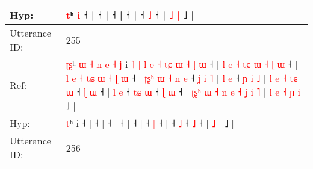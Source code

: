\documentclass[10pt]{article}
\DeclareRobustCommand{\hl}[1]{{\textcolor{red}{#1}}}
\begin{document}
\begin{longtable}{ll}
 \\
Hyp: & \hl{}\hl{}\hl{}\hl{}\hl{}\hl{}\hl{}\hl{}\hl{}\hl{}\hl{}\hl{}\hl{}\hl{}\hl{}\hl{t}ʰ \hl{i} ˧ |\hl{}\hl{}\hl{}\hl{}\hl{}\hl{}\hl{}\hl{}\hl{}\hl{}\hl{}\hl{} ˧\hl{}\hl{}\hl{}\hl{}\hl{}\hl{} |\hl{}\hl{}\hl{}\hl{} ˧\hl{}\hl{}\hl{}\hl{}\hl{}\hl{}\hl{}\hl{}\hl{}\hl{}\hl{}\hl{}\hl{}\hl{}\hl{}\hl{} |\hl{}\hl{}\hl{}\hl{} ˧ |\hl{}\hl{}\hl{}\hl{}\hl{}\hl{} ˧\hl{}\hl{} \hl{˩} ˧\hl{}\hl{}\hl{}\hl{}\hl{}\hl{} |\hl{}\hl{}\hl{}\hl{}\hl{}\hl{}\hl{}\hl{}\hl{}\hl{}\hl{}\hl{}\hl{}\hl{}\hl{}\hl{}\hl{} \hl{˩} \hl{}\hl{|} ˩ |
 \\
\midrule
Utterance ID: & 255 \\
Ref: & \hl{ʈ}\hl{ʂ}ʰ\hl{ }\hl{ɯ}\hl{ }\hl{˧}\hl{ }\hl{n}\hl{ }\hl{e}\hl{ }\hl{˧}\hl{ }\hl{ʝ} i\hl{ }\hl{˥}\hl{ }\hl{|}\hl{ }\hl{l}\hl{ }\hl{e}\hl{ }\hl{˧}\hl{ }\hl{t}\hl{ɕ}\hl{ }\hl{ɯ}\hl{ }\hl{˧}\hl{ }\hl{ɭ}\hl{ }\hl{ɯ} ˧ |\hl{ }\hl{l}\hl{ }\hl{e}\hl{ }\hl{˧}\hl{ }\hl{t}\hl{ɕ}\hl{ }\hl{ɯ}\hl{ }\hl{˧}\hl{ }\hl{ɭ}\hl{ }\hl{ɯ} ˧ |\hl{ }\hl{l}\hl{ }\hl{e}\hl{ }\hl{˧}\hl{ }\hl{t}\hl{ɕ}\hl{ }\hl{ɯ}\hl{ }\hl{˧}\hl{ }\hl{ɭ}\hl{ }\hl{ɯ} ˧ |\hl{ }\hl{ʈ}\hl{ʂ}\hl{ʰ}\hl{ }\hl{ɯ}\hl{ }\hl{˧}\hl{ }\hl{n}\hl{ }\hl{e} ˧\hl{ }\hl{ʝ}\hl{ }\hl{i}\hl{ }\hl{˥} |\hl{ }\hl{l}\hl{ }\hl{e} ˧\hl{ }\hl{ɲ}\hl{ }\hl{i}\hl{ }\hl{˩} |\hl{ }\hl{l}\hl{ }\hl{e}\hl{ }\hl{˧}\hl{ }\hl{t}\hl{ɕ}\hl{ }\hl{ɯ} ˧\hl{ }\hl{ɭ} \hl{ɯ} ˧ |\hl{ }\hl{l}\hl{ }\hl{e} ˧\hl{ }\hl{t}\hl{ɕ} \hl{ɯ} ˧\hl{ }\hl{ɭ} \hl{ɯ} ˧ |\hl{ }\hl{ʈ}\hl{ʂ}\hl{ʰ}\hl{ }\hl{ɯ}\hl{ }\hl{˧}\hl{ }\hl{n}\hl{ }\hl{e}\hl{ }\hl{˧}\hl{ }\hl{ʝ}\hl{ }\hl{i} \hl{˥} |\hl{ }\hl{l}\hl{ }\hl{e}\hl{ }\hl{˧}\hl{ }\hl{ɲ}\hl{ }\hl{i} ˩ |
 \\
Hyp: & \hl{}\hl{t}ʰ\hl{}\hl{}\hl{}\hl{}\hl{}\hl{}\hl{}\hl{}\hl{}\hl{}\hl{}\hl{} i\hl{}\hl{}\hl{}\hl{}\hl{}\hl{}\hl{}\hl{}\hl{}\hl{}\hl{}\hl{}\hl{}\hl{}\hl{}\hl{}\hl{}\hl{}\hl{}\hl{}\hl{} ˧ |\hl{}\hl{}\hl{}\hl{}\hl{}\hl{}\hl{}\hl{}\hl{}\hl{}\hl{}\hl{}\hl{}\hl{}\hl{}\hl{}\hl{} ˧ |\hl{}\hl{}\hl{}\hl{}\hl{}\hl{}\hl{}\hl{}\hl{}\hl{}\hl{}\hl{}\hl{}\hl{}\hl{}\hl{}\hl{} ˧ |\hl{}\hl{}\hl{}\hl{}\hl{}\hl{}\hl{}\hl{}\hl{}\hl{}\hl{}\hl{} ˧\hl{}\hl{}\hl{}\hl{}\hl{}\hl{} |\hl{}\hl{}\hl{}\hl{} ˧\hl{}\hl{}\hl{}\hl{}\hl{}\hl{} |\hl{}\hl{}\hl{}\hl{}\hl{}\hl{}\hl{}\hl{}\hl{}\hl{}\hl{} ˧\hl{}\hl{} \hl{|} ˧ |\hl{}\hl{}\hl{}\hl{} ˧\hl{}\hl{}\hl{} \hl{˩} ˧\hl{}\hl{} \hl{˩} ˧ |\hl{}\hl{}\hl{}\hl{}\hl{}\hl{}\hl{}\hl{}\hl{}\hl{}\hl{}\hl{}\hl{}\hl{}\hl{}\hl{}\hl{}\hl{} \hl{˩} |\hl{}\hl{}\hl{}\hl{}\hl{}\hl{}\hl{}\hl{}\hl{}\hl{} ˩ |
 \\
\midrule
Utterance ID: & 256 \\

\end{longtable}
\end{document}
